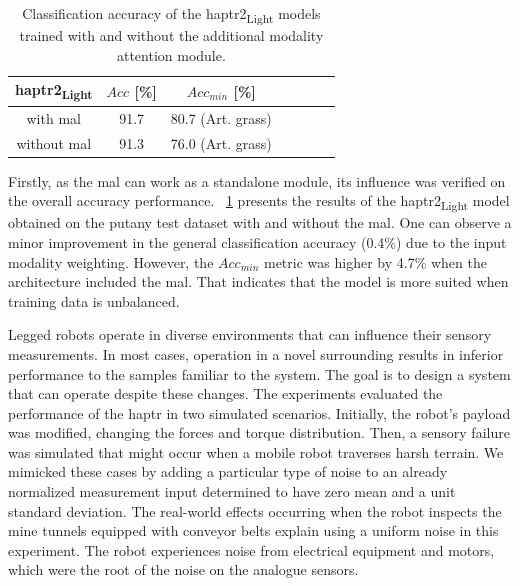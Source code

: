 \documentclass[a4paper, 10pt, twoside]{report}
\begin{document}
\begin{table}[htbp!]
    \centering
    \caption{ Classification accuracy of the \acrshort{haptr}2\textsubscript{Light} models trained with and without the additional modality attention module.}
    
    \begin{tabular}{ccccccc}
    \hline
        \acrshort{haptr}2\textsubscript{Light} & $Acc$ [\%] & $Acc_{min}$ [\%] \\ \hline
        with \acrshort{mal} & 91.7 & 80.7 (Art. grass) \\ 
        without \acrshort{mal} & 91.3 & 76.0 (Art. grass)\\ \hline
    \end{tabular}
    \label{tab:robustness_results}
\end{table} 

Firstly, as the \acrshort{mal} can work as a standalone module, its influence was verified on the overall accuracy performance. \Table~\ref{tab:robustness_results} presents the results of the \acrshort{haptr}2\textsubscript{Light} model obtained on the \acrshort{putany} test dataset with and without the \acrshort{mal}. One can observe a minor improvement in the general classification accuracy (0.4\%) due to the input modality weighting. However, the $Acc_{min}$ metric was higher by 4.7\% when the architecture included the \acrshort{mal}. That indicates that the model is more suited when training data is unbalanced.

Legged robots operate in diverse environments that can influence their sensory measurements. In most cases, operation in a novel surrounding results in inferior performance to the samples familiar to the system. The goal is to design a system that can operate despite these changes. The experiments evaluated the performance of the \acrshort{haptr} in two simulated scenarios. Initially, the robot's payload was modified, changing the forces and torque distribution. Then, a sensory failure was simulated that might occur when a mobile robot traverses harsh terrain. We mimicked these cases by adding a particular type of noise to an already normalized measurement input determined to have zero mean and a unit standard deviation. The real-world effects occurring when the robot inspects the mine tunnels equipped with conveyor belts explain using a uniform noise in this experiment. The robot experiences noise from electrical equipment and motors, which were the root of the noise on the analogue sensors.
\end{document}
